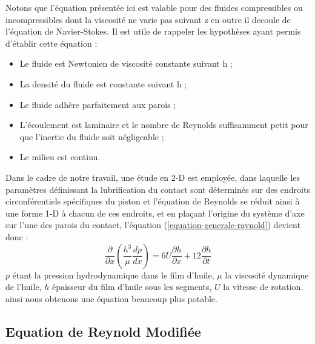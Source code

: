 Notons que l’équation présentée ici est valable pour des fluides compressibles ou incompressibles dont
la viscosité ne varie pas suivant z en outre il decoule de l'équation de Navier-Stokes. Il est utile de rappeler les hypothèses ayant permis d’établir cette équation :
\begin{itemize}
	\item Le fluide est Newtonien de viscosité constante suivant h ;
	\item La densité du fluide est constante suivant h ;
	\item Le fluide adhère parfaitement aux parois ;
	\item L’écoulement est laminaire et le nombre de Reynolds suffisamment petit pour que
	l’inertie du fluide soit négligeable ;
	\item Le milieu est continu.
\end{itemize}
Dans le cadre de notre travail, une étude en 2-D est employée, dans laquelle les paramètres définissant la lubrification du contact sont déterminés sur des endroits circonférentiels spécifiques du piston et l'équation de Reynolds se réduit ainsi à une forme 1-D à chacun de ces endroits, et en plaçant l'origine du système d'axe sur l'une des parois du contact, l'équation (\ref{equation-generale-raynold}) devient donc :
\begin{equation}
	\frac{\partial}{\partial x}{(\frac{h^3}{\mu}\frac{dp}{dx})}=6U\frac{\partial h}{\partial x}+12\frac{\partial h}{\partial t}
	\label{eq-reduite-raynold}
\end{equation}
$p$ étant la pression hydrodynamique dans le film d'huile, $\mu$ la viscosité dynamique de l'huile, $h$ épaisseur du film d'huile sous les segments, $U$ la vitesse de rotation. ainsi nous obtenons une équation beaucoup plus potable.

\subsection{Equation de Reynold Modifiée}

